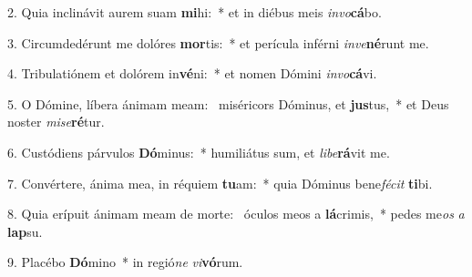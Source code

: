 2. Quia inclinávit aurem suam \textbf{mi}hi:~*  et in diébus meis \textit{in}\textit{vo}\textbf{cá}bo.\

3. Circumdedérunt me dolóres \textbf{mor}tis:~*  et perícula inférni \textit{in}\textit{ve}\textbf{né}runt me.\

4. Tribulatiónem et dolórem in\textbf{vé}ni:~*  et nomen Dómini \textit{in}\textit{vo}\textbf{cá}vi.\

5. O Dómine, líbera ánimam meam: \dag\  miséricors Dóminus, et \textbf{jus}tus,~*  et Deus noster \textit{mi}\textit{se}\textbf{ré}tur.\

6. Custódiens párvulos \textbf{Dó}minus:~*  humiliátus sum, et \textit{li}\textit{be}\textbf{rá}vit me.\

7. Convértere, ánima mea, in réquiem \textbf{tu}am:~*  quia Dóminus bene\textit{fé}\textit{cit} \textbf{ti}bi.\

8. Quia erípuit ánimam meam de morte: \dag\  óculos meos a \textbf{lá}crimis,~*  pedes me\textit{os} \textit{a} \textbf{lap}su.\

9. Placébo \textbf{Dó}mino~*  in regió\textit{ne} \textit{vi}\textbf{vó}rum.\

